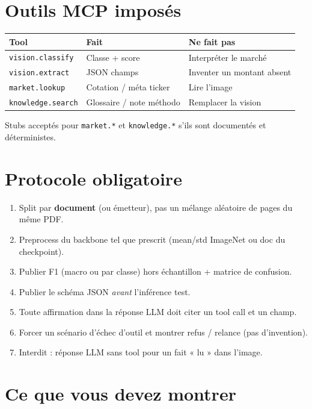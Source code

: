 \documentclass[11pt,a4paper]{article}
\begin{document}
\section{Outils MCP imposés}

\begin{center}
\renewcommand{\arraystretch}{1.2}
\begin{tabular}{@{}llp{7.6cm}@{}}
\toprule
\textbf{Tool} & \textbf{Fait} & \textbf{Ne fait pas} \\
\midrule
\texttt{vision.classify} & Classe + score & Interpréter le marché \\
\texttt{vision.extract} & JSON champs & Inventer un montant absent \\
\texttt{market.lookup} & Cotation / méta ticker & Lire l'image \\
\texttt{knowledge.search} & Glossaire / note méthodo & Remplacer la vision \\
\bottomrule
\end{tabular}
\end{center}

Stubs acceptés pour \texttt{market.*} et \texttt{knowledge.*} s'ils sont
documentés et déterministes.

\section{Protocole obligatoire}

\begin{enumerate}
  \item Split par \textbf{document} (ou émetteur), pas un mélange aléatoire de pages du même PDF.
  \item Preprocess du backbone tel que prescrit (mean/std ImageNet ou doc du checkpoint).
  \item Publier F1 (macro ou par classe) hors échantillon + matrice de confusion.
  \item Publier le schéma JSON \emph{avant} l'inférence test.
  \item Toute affirmation dans la réponse LLM doit citer un tool call et un champ.
  \item Forcer un scénario d'échec d'outil et montrer refus / relance (pas d'invention).
  \item Interdit : réponse LLM sans tool pour un fait « lu » dans l'image.
\end{enumerate}

\section{Ce que vous devez montrer}
\end{document}
